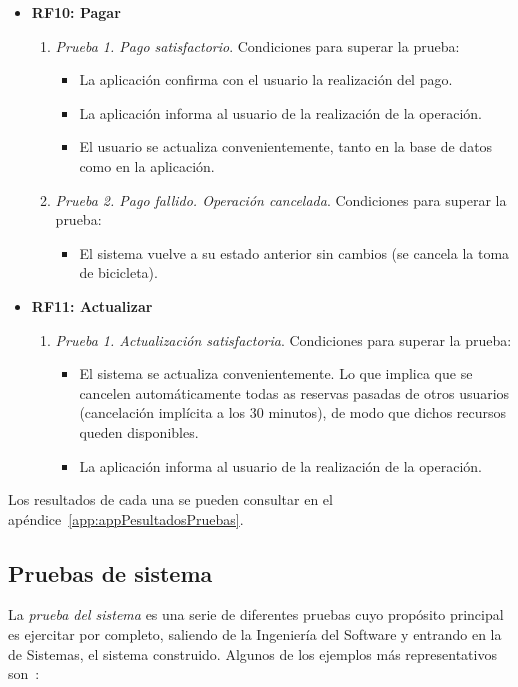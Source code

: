 \begin{itemize}
	\item \textbf{RF10: Pagar}
	\begin{enumerate}
		\item \textit{Prueba 1. Pago satisfactorio}. Condiciones para superar la prueba:
		\begin{itemize}
			\item La aplicación confirma con el usuario la realización del pago.
			\item La aplicación informa al usuario de la realización de la operación.
			\item El usuario se actualiza convenientemente, tanto en la base de datos como en la aplicación.
		\end{itemize}
		\item \textit{Prueba 2. Pago fallido. Operación cancelada}. Condiciones para superar la prueba:
		\begin{itemize}
			\item El sistema vuelve a su estado anterior sin cambios (se cancela la toma de bicicleta).
		\end{itemize}
	\end{enumerate}
		
	\item \textbf{RF11: Actualizar}
	\begin{enumerate}
		\item \textit{Prueba 1. Actualización satisfactoria}. Condiciones para superar la prueba:
		\begin{itemize}
			\item El sistema se actualiza convenientemente. Lo que implica que se cancelen automáticamente todas as reservas pasadas de otros usuarios (cancelación implícita a los 30 minutos), de modo que dichos recursos queden disponibles.
			\item La aplicación informa al usuario de la realización de la operación.
		\end{itemize}
	\end{enumerate}
\end{itemize}

Los resultados de cada una se pueden consultar en el apéndice~\ref{app:appPesultadosPruebas}.

\subsection{Pruebas de sistema}

La \emph{prueba del sistema} es una serie de diferentes pruebas cuyo propósito principal es ejercitar por completo, saliendo de la Ingeniería del Software y entrando en la de Sistemas, el sistema construido. Algunos de los ejemplos más representativos son~\cite{Pre10}:

